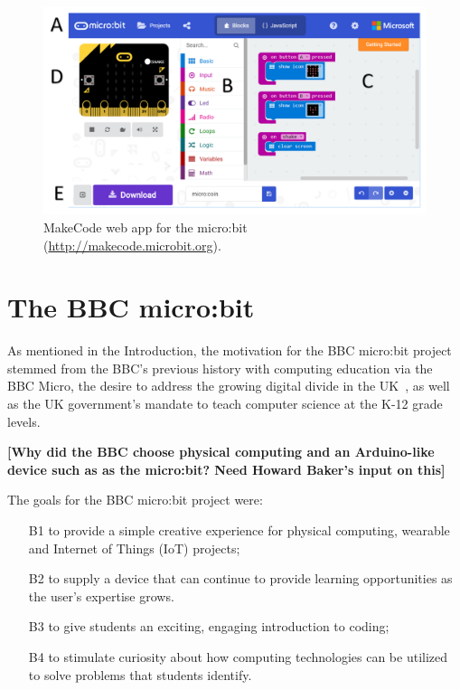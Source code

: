\begin{figure}[t]
    \includegraphics[width=6in]{images/webApp.png}
    \caption{\label{fig:snapshot}MakeCode web app for the micro:bit (\url{http://makecode.microbit.org}).}
  \end{figure}

\section{The BBC micro:bit}
\label{sec:microbit}

As mentioned in the Introduction, the motivation for the BBC micro:bit project
stemmed from the BBC's previous history with computing education via the BBC Micro, 
the desire to address the growing digital divide in the UK~\cite{XYZ},
as well as the UK government's mandate to teach computer science at the K-12 grade levels.

{\bf [Why did the BBC choose physical computing and an Arduino-like device such as
as the micro:bit? Need Howard Baker's input on this]}

The goals for the BBC micro:bit project were:
\begin{itemize}
    \item[B1] to provide a simple creative experience for physical computing, wearable and Internet of Things (IoT) projects;
    \item[B2] to supply a device that can continue to provide learning opportunities as the user's expertise grows.
    \item[B3] to give students an exciting, engaging introduction to coding;
    \item[B4] to stimulate curiosity about how computing technologies can be utilized to solve problems that students identify.
\end{itemize}

